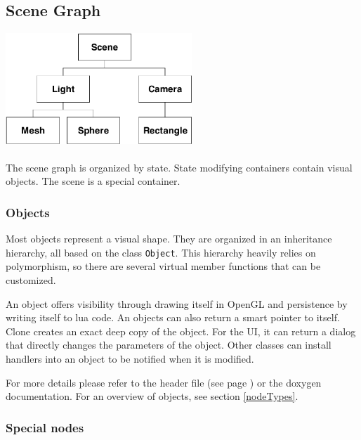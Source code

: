 \subsection{Scene Graph}

\begin{center}
\includegraphics[width=7cm]{media/scene.pdf}
\end{center}

\paragraph{}
The scene graph is organized by state.
State modifying containers contain visual objects.
The scene is a special container.

\subsubsection{Objects}
Most objects represent a visual shape.
They are organized in an inheritance hierarchy, all based on the class \texttt{Object}.
This hierarchy heavily relies on polymorphism, so there are several virtual member functions that can be customized.

An object offers visibility through drawing itself in OpenGL and persistence by writing itself to lua code.
An objects can also return a smart pointer to itself.
Clone creates an exact deep copy of the object.
For the UI, it can return a dialog that directly changes the parameters of the object.
Other classes can install handlers into an object to be notified when it is modified.

For more details please refer to the header file (see page \pageref{object.h}) or the doxygen documentation.
For an overview of objects, see section \ref{nodeTypes}.

\subsubsection{Special nodes\label{RendSpecial}}
